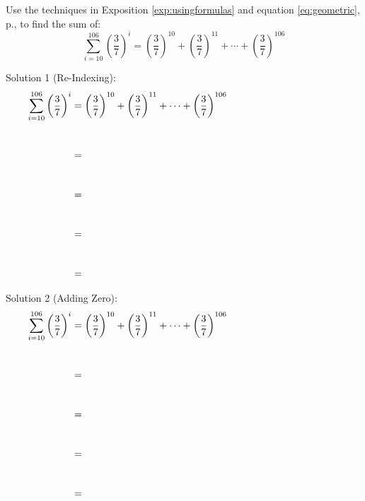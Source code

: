 \begin{practiceprob}
Use the techniques in Exposition \ref{exp:usingformulas} and equation \ref{eq:geometric}, p.\pageref{eq:geometric}, to find the sum of:
    \[\sum_{i=10}^{106} \left(\frac{3}{7}\right)^i = 
        \left(\frac{3}{7}\right)^{10}+\left(\frac{3}{7}\right)^{11}+\cdots+\left(\frac{3}{7}\right)^{106}\]

Solution 1 (Re-Indexing):
\begin{align*}
    \sum_{i=10}^{106} \left(\frac{3}{7}\right)^i 
        &= \left(\frac{3}{7}\right)^{10}+\left(\frac{3}{7}\right)^{11}+\cdots+\left(\frac{3}{7}\right)^{106}\hspace{0.33\textwidth}\\[25pt]
        &=\\[25pt]
        &=\\[25pt]
        &=\\[25pt]
        &=
\end{align*}\vspace{20pt}

Solution 2 (Adding Zero):
\begin{align*}
    \sum_{i=10}^{106} \left(\frac{3}{7}\right)^i 
        &= \left(\frac{3}{7}\right)^{10}+\left(\frac{3}{7}\right)^{11}+\cdots+\left(\frac{3}{7}\right)^{106}\hspace{0.33\textwidth}\\[25pt]
        &=\\[25pt]
        &=\\[25pt]
        &=\\[25pt]
        &=
\end{align*}\vspace{20pt}

\end{practiceprob}

\clearpage

